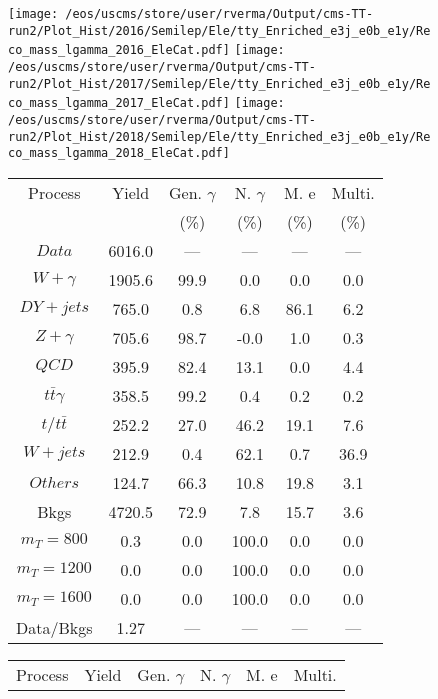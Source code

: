 \begin{figure}
\centering
\texttt{[image: /eos/uscms/store/user/rverma/Output/cms-TT-run2/Plot\_Hist/2016/Semilep/Ele/tty\_Enriched\_e3j\_e0b\_e1y/Reco\_mass\_lgamma\_2016\_EleCat.pdf]}
\texttt{[image: /eos/uscms/store/user/rverma/Output/cms-TT-run2/Plot\_Hist/2017/Semilep/Ele/tty\_Enriched\_e3j\_e0b\_e1y/Reco\_mass\_lgamma\_2017\_EleCat.pdf]}
\texttt{[image: /eos/uscms/store/user/rverma/Output/cms-TT-run2/Plot\_Hist/2018/Semilep/Ele/tty\_Enriched\_e3j\_e0b\_e1y/Reco\_mass\_lgamma\_2018\_EleCat.pdf]}
\begin{minipage}[c]{0.32\textwidth}
\centering
\tiny{
\begin{tabular}{cccccc}
\hline
Process & Yield & Gen. $\gamma$ & N. $\gamma$ & M. e & Multi. \\
 &  & (\%) & (\%) & (\%) & (\%)  \\
\hline
                                                                      $ Data $ &  6016.0 &  --- &  --- &  --- &  ---\\
$ W+\gamma $ &  1905.6 &  99.9 &  0.0 &  0.0 &  0.0\\
$ DY+jets $ &  765.0 &  0.8 &  6.8 &  86.1 &  6.2\\
$ Z+\gamma $ &  705.6 &  98.7 &  -0.0 &  1.0 &  0.3\\
$ QCD $ &  395.9 &  82.4 &  13.1 &  0.0 &  4.4\\
$ t\bar{t}\gamma $ &  358.5 &  99.2 &  0.4 &  0.2 &  0.2\\
$ t/t\bar{t} $ &  252.2 &  27.0 &  46.2 &  19.1 &  7.6\\
$ W+jets $ &  212.9 &  0.4 &  62.1 &  0.7 &  36.9\\
$ Others $ &  124.7 &  66.3 &  10.8 &  19.8 &  3.1\\
Bkgs &  4720.5 &  72.9 &  7.8 &  15.7 &  3.6\\
$ m_{T} = 800 $ &  0.3 &  0.0 &  100.0 &  0.0 &  0.0\\
$ m_{T} = 1200 $ &  0.0 &  0.0 &  100.0 &  0.0 &  0.0\\
$ m_{T} = 1600 $ &  0.0 &  0.0 &  100.0 &  0.0 &  0.0\\
Data/Bkgs &  1.27 &  --- &  --- &  --- &  ---\\
\hline
\end{tabular}
}
\end{minipage}
\begin{minipage}[c]{0.32\textwidth}
\centering
\tiny{
\begin{tabular}{cccccc}
\hline
Process & Yield & Gen. $\gamma$ & N. $\gamma$ & M. e & Multi. \\

\end{tabular}}
\end{minipage}
\end{figure}
